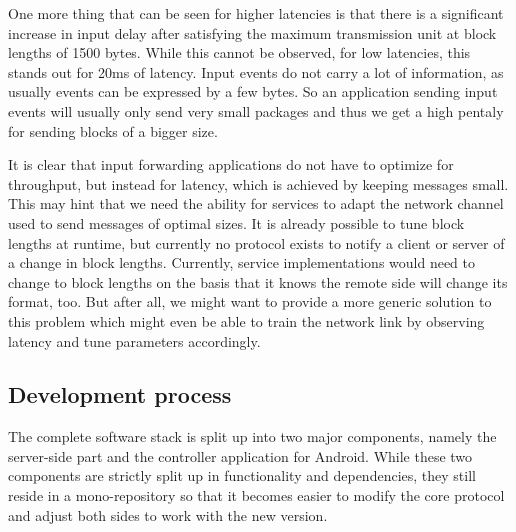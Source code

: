 One more thing that can be seen for higher latencies is that there is a significant increase in input delay after satisfying the maximum transmission unit at block lengths of 1500 bytes.
While this cannot be observed, for low latencies, this stands out for 20ms of latency.
Input events do not carry a lot of information, as usually events can be expressed by a few bytes.
So an application sending input events will usually only send very small packages and thus we get a high pentaly for sending blocks of a bigger size.

It is clear that input forwarding applications do not have to optimize for throughput, but instead for latency, which is achieved by keeping messages small.
This may hint that we need the ability for services to adapt the network channel used to send messages of optimal sizes.
It is already possible to tune block lengths at runtime, but currently no protocol exists to notify a client or server of a change in block lengths.
Currently, service implementations would need to change to block lengths on the basis that it knows the remote side will change its format, too.
But after all, we might want to provide a more generic solution to this problem which might even be able to train the network link by observing latency and tune parameters accordingly.

\subsection{Development process}

The complete software stack is split up into two major components, namely the server-side part and the controller application for Android.
While these two components are strictly split up in functionality and dependencies, they still reside in a mono-repository so that it becomes easier to modify the core protocol and adjust both sides to work with the new version.

